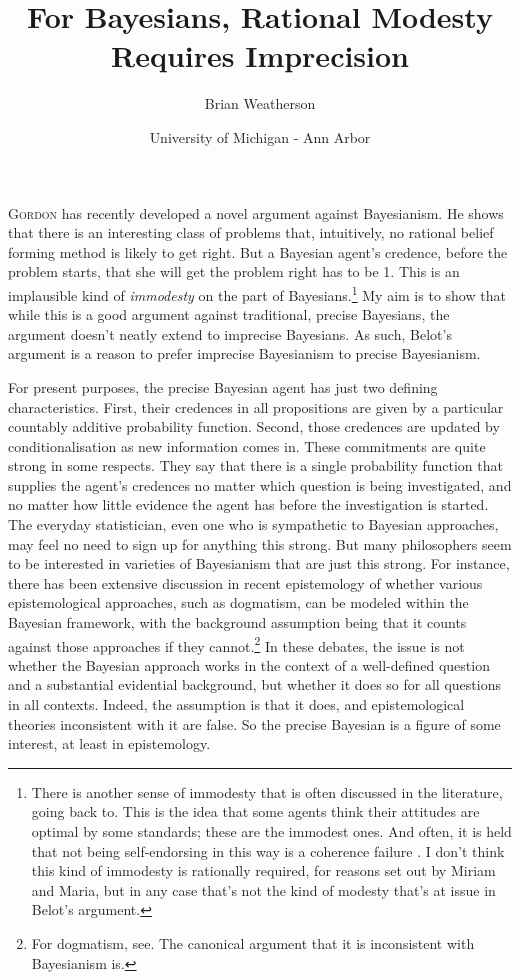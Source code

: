 \documentclass{ergoclass}
\title{For Bayesians, Rational \titlelinebreak Modesty Requires Imprecision}
\author{Brian Weatherson}
\date{University of Michigan - Ann Arbor}
\affiliation{University of Michigan, Ann Arbor}
\begin{document}
\maketitle

\lettrine{G}{ordon}\cite{Belot2013} has recently developed a novel argument against Bay\-es\-ianism. He shows that there is an interesting class of problems that, intuitively, no rational belief forming method is likely to get right. But a Bayesian agent's credence, before the problem starts, that she will get the problem right has to be 1. This is an implausible kind of \textit{immodesty} on the part of Bayesians.\footnote{There is another sense of immodesty that is often discussed in the literature, going back to\citet{Lewis1971d}. This is the idea that some agents think their attitudes are optimal by some standards; these are the immodest ones. And often, it is held that not being self-endorsing in this way is a coherence failure
\citep{Elga2010-ELGHTD}. %
I don't think this kind of immodesty is rationally required, for reasons set out by Miriam\citet{Schoenfield2014} and Maria\citet{Lasonen-Aarnio2015}, but in any case that's not the kind of modesty that's at issue in Belot's argument.} My aim is to show that while this is a good argument against traditional, precise Bayesians, the argument doesn't neatly extend to imprecise Bayesians. As such, Belot's argument is a reason to prefer imprecise Bayesianism to precise Bayesianism.

For present purposes, the precise Bayesian agent has just two defining characteristics. First, their credences in all propositions are given by a particular countably additive probability function. Second, those credences are updated by conditionalisation as new information comes in. These commitments are quite strong in some respects. They say that there is a single probability function that supplies the agent's credences no matter which question is being investigated, and no matter how little evidence the agent has before the investigation is started. The everyday statistician, even one who is sympathetic to Bayesian approaches, may feel no need to sign up for anything this strong. But many philosophers seem to be interested in varieties of Bayesianism that are just this strong. For instance, there has been extensive discussion in recent epistemology of whether various epistemological approaches, such as dogmatism, can be modeled within the Bayesian framework, with the background assumption being that it counts against those approaches if they cannot.\footnote{For dogmatism, see\cite{Pryor2000}. The canonical argument that it is inconsistent with Bayesianism is\cite{White2006}.} In these debates, the issue is not whether the Bayesian approach works in the context of a well-defined question and a substantial evidential background, but whether it does so for all questions in all contexts. Indeed, the assumption is that it does, and epistemological theories inconsistent with it are false. So the precise Bayesian is a figure of some interest, at least in epistemology.
\end{document}
